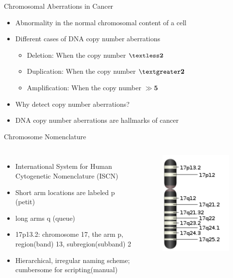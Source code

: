 \documentclass[first=dgreen,second=purple,logo=redexc]{aaltoslides}
\begin{document}
\begin{frame}{Chromosomal Aberrations  in Cancer}
\begin{itemize} \setlength{\itemsep}{6mm}
  \item Abnormality in the normal chromosomal content of a cell
  \item Different cases of DNA copy number aberrations
  \begin{itemize}\setlength{\itemsep}{2.5mm}
    \item Deletion: When the copy number $\boldsymbol{\textless 2} $ 
    \item Duplication: When the copy number $\boldsymbol{\textgreater 2}$
    \item Amplification: When the copy number $\boldsymbol {\gg 5}$
  \end{itemize}
  \item Why detect copy number aberrations?
  \item DNA copy number aberrations are hallmarks of cancer
\end{itemize}
\end{frame}


\begin{frame}{Chromosome Nomenclature }
\begin{columns}
\begin{itemize}
  \item International System for Human Cytogenetic Nomenclature (ISCN)
  \item Short arm locations are labeled p (petit) 
  \item long arms q (queue)
  \item 17p13.2: chromosome 17, the arm p, region(band) 13, subregion(subband) 2
  \item Hierarchical, irregular naming scheme; cumbersome for scripting(manual)
\end{itemize}
\begin{figure}
\includegraphics[height=5.7 cm]{figures/nchr17}
\end{figure}
\end{columns}
\end{frame}
\end{document}
